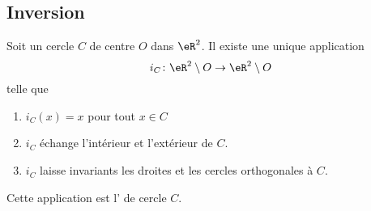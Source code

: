 \subsection{Inversion}

\begin{propositionDef}       \label{PROPDEFooVLIWooQgpLQa}
    Soit un cercle \( C\) de centre \( O\) dans \( \eR^2\). Il existe une unique application
    \begin{equation}
        i_C\colon \eR^2\setminus O\to \eR^2\setminus O
    \end{equation}
    telle que
    \begin{enumerate}
        \item
            \( i_C(x)=x\) pour tout \( x\in C\)
        \item\label{ITEMooXLZCooEGAxHu}
            \( i_C\) échange l'intérieur et l'extérieur de \( C\).
        \item\label{ITEMooCPPUooDJIzSk}
            \( i_C\) laisse invariants les droites et les cercles orthogonales à \( C\).
    \end{enumerate}
    Cette application est l' de cercle \( C\).
\end{propositionDef}

